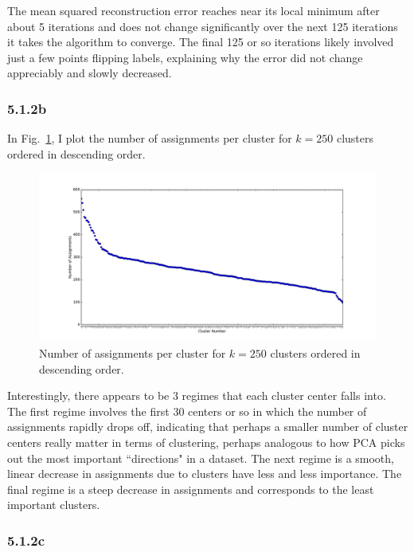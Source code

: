\documentclass[12pt]{amsart}
\begin{document}
The mean squared reconstruction error reaches near its local minimum after about 5 iterations and does not change significantly over the next 125 iterations it takes the algorithm to converge.  The final 125 or so iterations likely involved just a few points flipping labels, explaining why the error did not change appreciably and slowly decreased.

\subsubsection*{5.1.2b}

In Fig.~\ref{fig:k_250_num_assignments}, I plot the number of assignments per cluster for $k = 250$ clusters ordered in descending order.

\begin{figure}[H]
	\includegraphics[width=\columnwidth]{k_250_num_assignments.pdf}
    \caption{Number of assignments per cluster for $k = 250$ clusters ordered in descending order.}
    \label{fig:k_250_num_assignments}
\end{figure}

Interestingly, there appears to be 3 regimes that each cluster center falls into.  The first regime involves the first 30 centers or so in which the number of assignments rapidly drops off, indicating that perhaps a smaller number of cluster centers really matter in terms of clustering, perhaps analogous to how PCA picks out the most important ``directions" in a dataset.  The next regime is a smooth, linear decrease in assignments due to clusters have less and less importance.  The final regime is a steep decrease in assignments and corresponds to the least important clusters.

\subsubsection*{5.1.2c}
\end{document}
